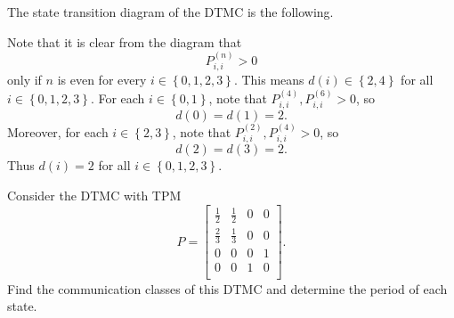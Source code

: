 \documentclass[stat333]{subfiles}
\begin{document}
    \begin{subproof}[Answer]
        The state transition diagram of the DTMC is the following.
        \begin{center}
        \end{center}
        Note that it is clear from the diagram that
        \begin{equation*}
            P^{\left( n \right)}_{i,i}>0
        \end{equation*}
        only if $n$ is even for every $i\in\left\lbrace 0,1,2,3 \right\rbrace$. This means $d\left( i \right)\in\left\lbrace 2,4 \right\rbrace$ for all $i\in\left\lbrace 0,1,2,3 \right\rbrace$. For each $i\in\left\lbrace 0,1 \right\rbrace$, note that $P^{\left( 4 \right)}_{i,i}, P^{\left( 6 \right)}_{i,i} > 0$, so 
        \begin{equation*}
            d\left( 0 \right)=d\left( 1 \right)=2.
        \end{equation*}
        Moreover, for each $i\in\left\lbrace 2,3 \right\rbrace$, note that $P^{\left( 2 \right)}_{i,i}, P^{\left( 4 \right)}_{i,i}>0$, so
        \begin{equation*}
            d\left( 2 \right)=d\left( 3 \right)=2.
        \end{equation*}
        Thus $d\left( i \right)=2$ for all $i\in\left\lbrace 0,1,2,3 \right\rbrace$.
    \end{subproof}

    \ex Consider the DTMC with TPM
    \begin{equation*}
        P =
        \begin{bmatrix}
        	\frac{1}{2} & \frac{1}{2} & 0 & 0 \\
        	\frac{2}{3} & \frac{1}{3} & 0 & 0 \\
        	0 & 0 & 0 & 1 \\
        	0 & 0 & 1 & 0 \\
        \end{bmatrix}.
    \end{equation*}
    Find the communication classes of  this DTMC and determine the period of each state.
\end{document}
